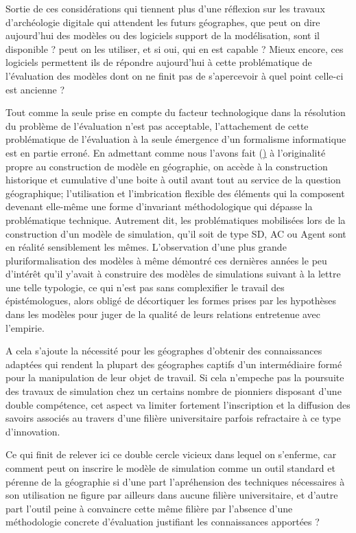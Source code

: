 Sortie de ces considérations qui tiennent plus d'une réflexion sur les travaux d'archéologie digitale qui attendent les futurs géographes, que peut on dire aujourd'hui des modèles ou des logiciels support de la modélisation, sont il disponible ? peut on les utiliser, et si oui, qui en est capable ? Mieux encore, ces logiciels permettent ils de répondre aujourd'hui à cette problématique de l'évaluation des modèles dont on ne finit pas de s'apercevoir à quel point celle-ci est ancienne ?



Tout comme la seule prise en compte du facteur technologique dans la résolution du problème de l'évaluation n'est pas acceptable, l'attachement de cette problématique de l'évaluation à la seule émergence d'un formalisme informatique est en partie erroné. En admettant comme nous l'avons fait (\href{section}) à l'originalité propre au construction de modèle en géographie, on accède à la construction historique et cumulative d'une boite à outil avant tout au service de la question géographique; l'utilisation et l'imbrication flexible des éléments qui la composent devenant elle-même une forme d'invariant méthodologique qui dépasse la problématique technique. Autrement dit, les problématiques mobilisées lors de la construction d'un modèle de simulation, qu'il soit de type SD, AC ou Agent sont en réalité sensiblement les mêmes. L'observation d'une plus grande pluriformalisation des modèles à même démontré ces dernières années le peu d'intérêt qu'il y'avait à construire des modèles de simulations suivant à la lettre une telle typologie, ce qui n'est pas sans complexifier le travail des épistémologues, alors obligé de décortiquer les formes prises par les hypothèses dans les modèles pour juger de la qualité de leurs relations entretenue avec l'empirie. 



A cela s'ajoute la nécessité pour les géographes d'obtenir des connaissances adaptées qui rendent la plupart des géographes captifs d'un intermédiaire formé pour la manipulation de leur objet de travail. Si cela n'empeche pas la poursuite des travaux de simulation chez un certains nombre de pionniers disposant d'une double compétence, cet aspect va limiter fortement l'inscription et la diffusion des savoirs associés au travers d'une filière universitaire parfois refractaire à ce type d'innovation. 

Ce qui finit de relever ici ce double cercle vicieux dans lequel on s'enferme, car comment peut on inscrire le modèle de simulation comme un outil standard et pérenne de la géographie si d'une part l'apréhension des techniques nécessaires à son utilisation ne figure par ailleurs dans aucune filière universitaire, et d'autre part l'outil peine à convaincre cette même filière par l'absence d'une méthodologie concrete d'évaluation justifiant les connaissances apportées ?    

